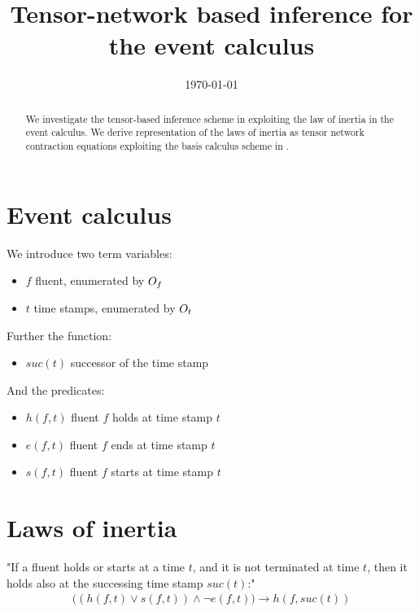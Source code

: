 \documentclass[aps,onecolumn,nofootinbib,pra]{article}
\begin{document}
    \title{Tensor-network based inference for the event calculus}

    \maketitle
    \date{\today}

    \begin{abstract}
        We investigate the tensor-based inference scheme in \cite{tsilionis_tensor-based_2024} exploiting the law of inertia in the event calculus.
        We derive representation of the laws of inertia as tensor network contraction equations exploiting the basis calculus scheme in \cite{goessmann_tensor_2026}.
    \end{abstract}


    \section{Event calculus}

    We introduce two term variables:
    \begin{itemize}
        \item $f$ fluent, enumerated by $O_{f}$
        \item $t$ time stamps, enumerated by $O_{t}$
    \end{itemize}

    Further the function:
    \begin{itemize}
        \item $suc(t)$ successor of the time stamp
    \end{itemize}

    And the predicates:
    \begin{itemize}
        \item $h(f,t)$ fluent $f$ holds at time stamp $t$
        \item $e(f,t)$ fluent $f$ ends at time stamp $t$
        \item $s(f,t)$ fluent $f$ starts at time stamp $t$
    \end{itemize}


    \section{Laws of inertia}

    "If a fluent holds or starts at a time $t$, and it is not terminated at time $t$, then it holds also at the successing time stamp $suc(t)$:"
    \begin{align*}
        \big((h(f,t)  \lor s(f,t)) \land \lnot e(f,t) \big)
        \rightarrow h(f,suc(t))
    \end{align*}
\end{document}
